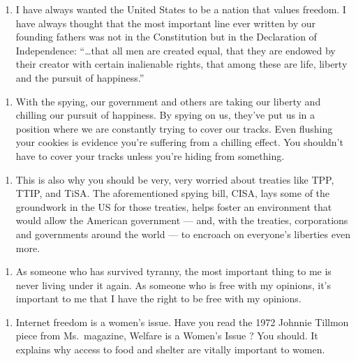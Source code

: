 \begin{enumerate}
\def\labelenumi{\arabic{enumi}.}
\setcounter{enumi}{12}
\tightlist
\item
  I have always wanted the United States to be a nation that values
  freedom. I have always thought that the most important line ever
  written by our founding fathers was not in the Constitution but in the
  Declaration of Independence: ``\ldots{}that all men are created equal,
  that they are endowed by their creator with certain inalienable
  rights, that among these are life, liberty and the pursuit of
  happiness.''
\end{enumerate}

\begin{enumerate}
\def\labelenumi{\arabic{enumi}.}
\setcounter{enumi}{13}
\tightlist
\item
  With the spying, our government and others are taking our liberty and
  chilling our pursuit of happiness. By spying on us, they've put us in
  a position where we are constantly trying to cover our tracks. Even
  flushing your cookies is evidence you're suffering from a chilling
  effect. You shouldn't have to cover your tracks unless you're hiding
  from something.
\end{enumerate}

\begin{enumerate}
\def\labelenumi{\arabic{enumi}.}
\setcounter{enumi}{14}
\tightlist
\item
  This is also why you should be very, very worried about treaties like
  TPP, TTIP, and TiSA. The aforementioned spying bill, CISA, lays some
  of the groundwork in the US for those treaties, helps foster an
  environment that would allow the American government --- and, with the
  treaties, corporations and governments around the world --- to
  encroach on everyone's liberties even more.
\end{enumerate}

\begin{enumerate}
\def\labelenumi{\arabic{enumi}.}
\setcounter{enumi}{15}
\tightlist
\item
  As someone who has survived tyranny, the most important thing to me is
  never living under it again. As someone who is free with my opinions,
  it's important to me that I have the right to be free with my
  opinions.
\end{enumerate}

\begin{enumerate}
\def\labelenumi{\arabic{enumi}.}
\setcounter{enumi}{16}
\tightlist
\item
  Internet freedom is a women's issue. Have you read the 1972 Johnnie
  Tillmon piece from Ms.~magazine, Welfare is a Women's Issue ? You
  should. It explains why access to food and shelter are vitally
  important to women.
\end{enumerate}

